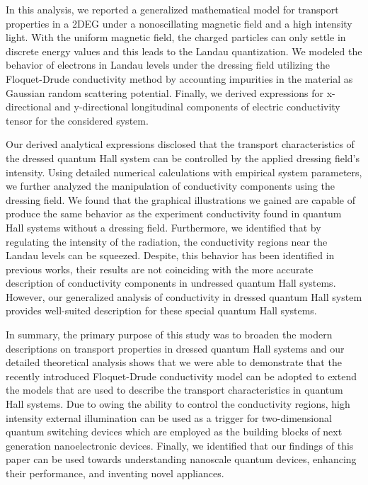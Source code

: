 In this analysis, we reported a generalized mathematical model for transport properties in a 2DEG under a nonoscillating magnetic field and a high intensity light. With the uniform magnetic field, the charged particles can only settle in discrete energy values and this leads to the Landau quantization. We modeled the behavior of electrons in Landau levels under the dressing field utilizing the Floquet-Drude conductivity method by accounting impurities in the material as Gaussian random scattering potential. Finally, we derived expressions for x-directional and y-directional longitudinal components of electric conductivity tensor for the considered system.

Our derived analytical expressions disclosed that the transport characteristics of the dressed quantum Hall system can be controlled by the applied dressing field’s intensity. Using detailed numerical calculations with empirical system parameters, we further analyzed the manipulation of conductivity components using the dressing field. We found that the graphical illustrations we gained are capable of produce the same behavior as the experiment conductivity found in quantum Hall systems without a dressing field. Furthermore, we identified that by regulating the intensity of the radiation, the conductivity regions near the Landau levels can be squeezed. Despite, this behavior has been identified in previous works, their results are not coinciding with the more accurate description of conductivity components in undressed quantum Hall systems. However, our generalized analysis of conductivity in dressed quantum Hall system provides well-suited description for these special quantum Hall systems.

In summary, the primary purpose of this study was to broaden the modern descriptions on transport properties in dressed quantum Hall systems and our  detailed theoretical analysis shows that we were able to demonstrate that the  recently introduced Floquet-Drude conductivity model can be adopted to extend the models that are used to describe the transport characteristics in quantum Hall systems. Due to owing the ability to control the conductivity regions, high intensity external illumination can be used as a trigger for two-dimensional quantum switching devices which are employed as the building blocks of next generation nanoelectronic devices. Finally, we identified that our findings of this paper can be used towards understanding nanoscale quantum devices, enhancing their performance, and inventing novel appliances.
